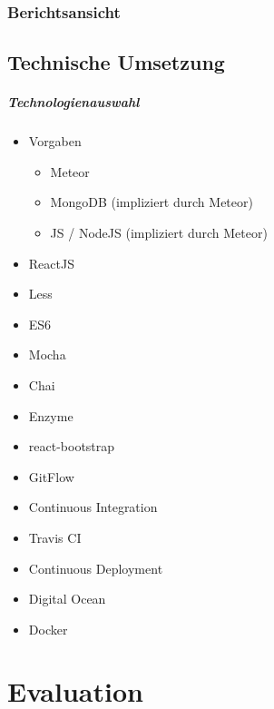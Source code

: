 \documentclass[
  language=german, %
  type=bachelor%
]{isthesis}
\begin{document}
\begin{content}
  \subsection{Berichtsansicht}


  \section{Technische Umsetzung}

  \paragraph{Technologienauswahl}
  \begin{itemize}
    \item Vorgaben
      \begin{itemize}
        \item Meteor
        \item MongoDB (impliziert durch Meteor)
        \item JS / NodeJS (impliziert durch Meteor)
      \end{itemize}
    \item ReactJS
    \item Less
    \item ES6
    \item Mocha
    \item Chai
    \item Enzyme
    \item react-bootstrap
  \end{itemize}

  \begin{itemize}
    \item GitFlow
    \item Continuous Integration
    \item Travis CI
    \item Continuous Deployment
    \item Digital Ocean
    \item Docker
  \end{itemize}


\chapter{Evaluation}

\end{content}
\end{document}
